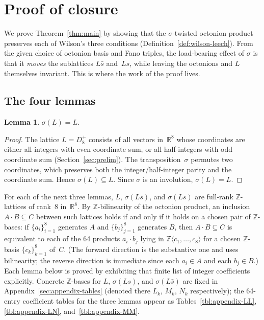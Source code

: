 \documentclass[twoside,english]{paper}
\numberwithin{equation}{section}
\numberwithin{figure}{section}
\newtheorem{lemma}[theorem]{Lemma}
\theoremstyle{definition}
\theoremstyle{remark}
\newcommand{\RR}{\mathbb{R}}
\newcommand{\ZZ}{\mathbb{Z}}
\begin{document}
\section{Proof of closure}\label{sec:proof}

We prove Theorem~\ref{thm:main} by showing that the $\sigma$-twisted
octonion product preserves each of Wilson's three conditions
(Definition~\ref{def:wilson-leech}).  From
the given choice of octonion basis and Fano triples, the
load-bearing effect of $\sigma$ is that it \emph{moves} the
sublattices $L\bar s$ and~$Ls$, while leaving the octonions and $L$
themselves invariant.  This is where the work of the proof lives.

\subsection{The four lemmas}

\begin{lemma}\label{lem:sigma-L}
$\sigma(L) = L$.
\end{lemma}

\begin{proof}
The lattice $L = D_8^+$ consists of all vectors in~$\RR^8$ whose
coordinates are either all integers with even coordinate sum, or all
half-integers with odd coordinate sum (Section~\ref{sec:prelim}).  The
transposition~$\sigma$ permutes two coordinates, which preserves both
the integer/half-integer parity and the coordinate sum.  Hence
$\sigma(L) \subseteq L$.  Since $\sigma$ is an involution,
$\sigma(L) = L$.
\end{proof}

For each of the next three lemmas, $L$, $\sigma(L\bar s)$, and
$\sigma(Ls)$ are full-rank $\ZZ$-lattices of rank~$8$ in~$\RR^8$.  By
$\ZZ$-bilinearity of the octonion product, an inclusion $A \cdot B
\subseteq C$ between such lattices holds if and only if it holds on a
chosen pair of $\ZZ$-bases: if $\{a_i\}_{i=1}^8$ generates $A$ and
$\{b_j\}_{j=1}^8$ generates $B$, then $A\cdot B \subseteq C$ is
equivalent to each of the 64 products $a_i\cdot b_j$ lying in
$\ZZ\langle c_1,\ldots,c_8\rangle$ for a chosen $\ZZ$-basis
$\{c_k\}_{k=1}^8$ of~$C$.  (The forward direction is the substantive
one and uses bilinearity; the reverse direction is immediate
since each $a_i\in A$ and each $b_j\in B$.)  Each lemma below is
proved by exhibiting that finite list of integer coefficients
explicitly.  Concrete
$\ZZ$-bases for $L$, $\sigma(Ls)$, and $\sigma(L\bar s)$ are fixed in
Appendix~\ref{sec:appendix-tables} (denoted there $L_k$, $M_k$, $N_k$
respectively); the 64-entry coefficient tables for the three
lemmas appear as Tables~\ref{tbl:appendix-LL},
\ref{tbl:appendix-LN}, and~\ref{tbl:appendix-MM}.
\end{document}
